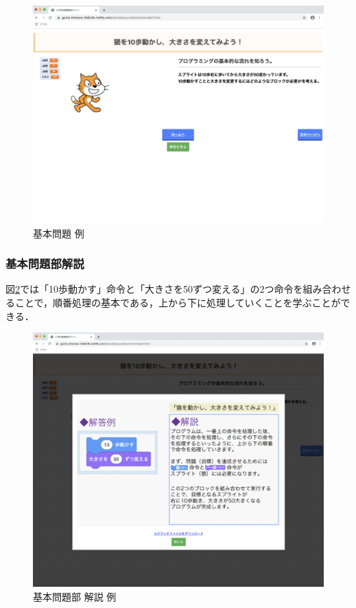 \begin{figure}[h]
\begin{center}
\includegraphics[width=15cm]{zyunnbanntoi.pdf}
\caption{基本問題 例}
\label{fig:kihonrei}
\end{center}
\end{figure}

\newpage

\subsubsection{基本問題部解説}
図\ref{fig:kihonreik}では「10歩動かす」命令と「大きさを50ずつ変える」の2つ命令を組み合わせることで，順番処理の基本である，上から下に処理していくことを学ぶことができる．

\begin{figure}[h]
\begin{center}
\includegraphics[width=15cm]{zyunnbannkotae.pdf}
\caption{基本問題部 解説 例}
\label{fig:kihonreik}
\end{center}
\end{figure}
\newpage

